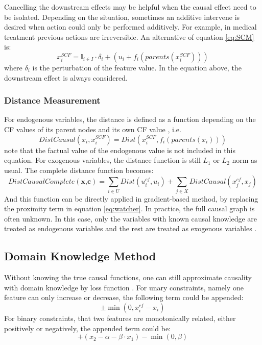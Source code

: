 Cancelling the downstream effects may be helpful when the causal effect need to be isolated. Depending on the situation, sometimes an additive intervene is desired when action could only be performed additively. For example, in medical treatment previous actions are irreversible. An alternative of equation \ref{eq:SCM} is:
\begin{equation}\label{eq:SCMsoft}
  x_i^{SCF}=\mathbb{I}_{i\in I}\cdot \delta_i+(u_i+f_i(parents(x_i^{SCF})))
\end{equation}
where $\delta_i$ is the perturbation of the feature value. In the equation above, the downstream effect is always considered.

\subsubsection{Distance Measurement} For endogenous variables, the distance is defined as a function depending on the CF values of its parent nodes and its own CF value \cite{preservingCausal}, i.e.
\begin{equation}\label{eq:CausalDist}
  DistCausal(x_i,x_i^{SCF})=Dist(x_i^{SCF},f_i(parents(x_i)))
\end{equation}
note that the factual value of the endogenous value is not included in this equation. For exogenous variables, the distance function is still $L_1$ or $L_2$ norm as usual. The complete distance function becomes:
\begin{equation}\label{eq:CausalDistComplete}
  DistCausalComplete(\textbf{x,c})=\sum_{i\in U}Dist(u_i^{cf},u_i)+\sum_{j\in X}DistCausal(x_j^{cf},x_j)
\end{equation}
And this function can be directly applied in gradient-based method, by replacing the proximity term in equation \ref{eq:watcher}. In practice, the full causal graph is often unknown. In this case, only the variables with known causal knowledge are treated as endogenous variables and the rest are treated as exogenous variables \cite{preservingCausal}.

\subsection{Domain Knowledge Method} 
Without knowing the true causal functions, one can still approximate causality with domain knowledge by loss function \cite{preservingCausal}. For unary constraints, namely one feature can only increase or decrease, the following term could be appended:
\begin{equation}\label{eq:approxUnary}
  \pm \min(0,x_i^{cf}-x_i)
\end{equation}  
For binary constraints, that two features are monotonically related, either positively or negatively, the appended term could be:
\begin{equation}\label{eq:approxBi}
  +(x_2-\alpha-\beta\cdot x_1)-\min(0,\beta)
\end{equation}
